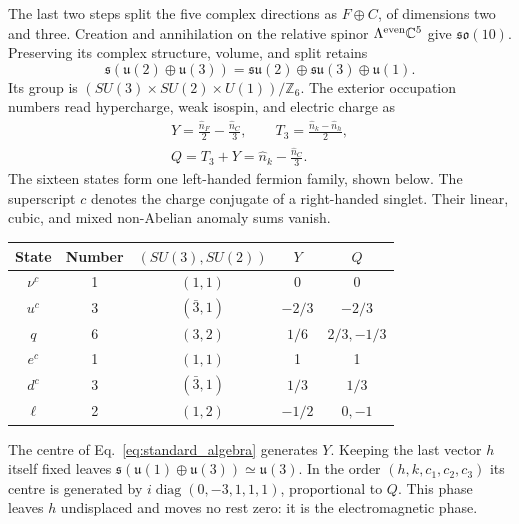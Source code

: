 \documentclass[aps,prx,reprint,longbibliography]{revtex4-2}
\providecommand{\diag}{\operatorname{diag}}
\begin{document}
The last two steps split the five complex directions as $F\oplus C$, of dimensions two and three. Creation and annihilation on the relative spinor $\Lambda^{\rm even}\mathbb C^5$ give $\mathfrak{so}(10)$. Preserving its complex structure, volume, and split retains
\begin{equation}
 \mathfrak s(\mathfrak u(2)\oplus\mathfrak u(3))
 =\mathfrak{su}(2)\oplus\mathfrak{su}(3)\oplus\mathfrak u(1).
 \label{eq:standard_algebra}
\end{equation}
Its group is $(SU(3)\times SU(2)\times U(1))/\mathbb Z_6$. The exterior occupation numbers read hypercharge, weak isospin, and electric charge as
\begin{equation}
\begin{gathered}
 Y=\frac{\widehat n_F}{2}-\frac{\widehat n_C}{3},\qquad
 T_3=\frac{\widehat n_k-\widehat n_h}{2},\\
 Q=T_3+Y=\widehat n_k-\frac{\widehat n_C}{3}.
 \end{gathered}
 \label{eq:charges}
\end{equation}
The sixteen states form one left-handed fermion family, shown below. The superscript $c$ denotes the charge conjugate of a right-handed singlet. Their linear, cubic, and mixed non-Abelian anomaly sums vanish.

\begin{center}\small
\begin{tabular}{@{}ccccc@{}}
\toprule
State & Number & $(SU(3),SU(2))$ & $Y$ & $Q$\\
\midrule
$\nu^c$ &1&$(1,1)$&0&0\\
$u^c$ &3&$(\bar3,1)$&$-2/3$&$-2/3$\\
$q$ &6&$(3,2)$&$1/6$&$2/3,-1/3$\\
$e^c$ &1&$(1,1)$&1&1\\
$d^c$ &3&$(\bar3,1)$&$1/3$&$1/3$\\
$\ell$ &2&$(1,2)$&$-1/2$&$0,-1$\\
\bottomrule
\end{tabular}
\end{center}

The centre of Eq.~\eqref{eq:standard_algebra} generates $Y$. Keeping the last vector $h$ itself fixed leaves $\mathfrak s(\mathfrak u(1)\oplus\mathfrak u(3))\simeq\mathfrak u(3)$. In the order $(h,k,c_1,c_2,c_3)$ its centre is generated by $i\diag(0,-3,1,1,1)$, proportional to $Q$. This phase leaves $h$ undisplaced and moves no rest zero: it is the electromagnetic phase.
\end{document}
